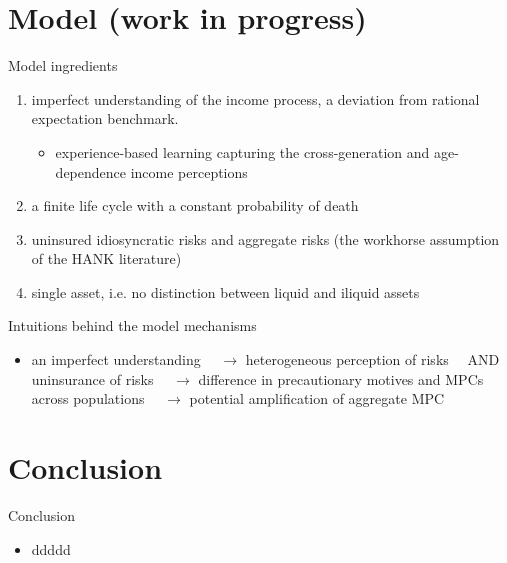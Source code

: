 \documentclass{beamer}
\begin{document}
\section{Model (work in progress)}

\begin{frame}{Model ingredients}
	
	\begin{enumerate}
		\item imperfect understanding of the income process, a deviation from rational expectation benchmark. 
		\begin{itemize}
			\item experience-based learning capturing the cross-generation and age-dependence income perceptions
		\end{itemize}
		\item a finite life cycle with a constant probability of death 
		\item uninsured idiosyncratic risks and aggregate risks (the workhorse assumption of the HANK literature) 
		\item single asset, i.e. no distinction between liquid and iliquid assets 
	\end{enumerate}
\end{frame}

\begin{frame}{Intuitions behind the model mechanisms}
	\begin{itemize}
		\item an imperfect understanding $ \quad \rightarrow$ heterogeneous perception of risks $ \quad \text{AND } $ uninsurance of risks $ \quad \rightarrow$ difference in precautionary motives and MPCs across populations $ \quad \rightarrow$ potential amplification of aggregate MPC
	\end{itemize}
\end{frame}





\section{Conclusion}

\begin{frame}{Conclusion}
	\begin{itemize}
		\item ddddd
	\end{itemize}	
\end{frame}



\end{document}
